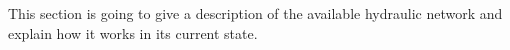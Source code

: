 This section is going to give a description of the available hydraulic network and explain how it works in its current state.   


